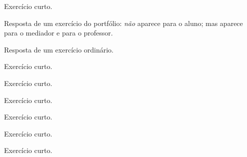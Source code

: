 \documentclass[a4paper]{article}
\begin{document}
\begin{exercicio}
  Exercício curto.
\end{exercicio}

\begin{respostas}
  \begin{exercicio*}
    Resposta de um exercício do portfólio:
    \emph{não} aparece para o aluno;
    mas aparece para o mediador e para o professor.
  \end{exercicio*}
  
  \begin{exercicio}
    Resposta de um exercício ordinário.
  \end{exercicio}
  
  \begin{exercicio}
    \lipsum[1-18]
  \end{exercicio}
  
  \begin{exercicio}
    Exercício curto.
  \end{exercicio}

  \begin{exercicio}
    Exercício curto.
  \end{exercicio}

  \begin{exercicio}
    Exercício curto.
  \end{exercicio}

  \begin{exercicio}
    Exercício curto.
  \end{exercicio}

  \begin{exercicio}
    Exercício curto.
  \end{exercicio}

  \begin{exercicio}
    Exercício curto.
  \end{exercicio}
\end{respostas}
\end{document}
